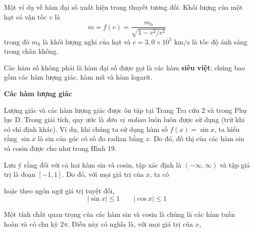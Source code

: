 \begin{minipage}[t]{0.708\textwidth}
    \fontsize{9.3pt}{13.2pt}\selectfont
    Một ví dụ về hàm đại số xuất hiện trong thuyết tương đối. Khối lượng của một hạt có vận tốc $v$ là
    \begin{equation*}
    m = f(v) = \frac{m_0}{\sqrt{1 - v^2/c^2}}
    \end{equation*}
    trong đó $m_0$ là khối lượng nghỉ của hạt và $c = 3{,}0 \times 10^5\text{ km/s}$ là tốc độ ánh sáng trong chân không.

    \vspace{4pt}
    Các hàm số không phải là hàm đại số được gọi là các hàm \textbf{siêu việt}; chúng bao gồm các hàm lượng giác, hàm mũ và hàm logarit.

    \vspace{10pt}
    \noindent{\color{stewartcyan}\rule{1.2ex}{1.2ex}}\hspace{0.5em}\textbf{\textsf{\large Các hàm lượng giác}}\par\vspace{6pt}
    Lượng giác và các hàm lượng giác được ôn tập tại Trang Tra cứu 2 và trong Phụ lục D. Trong giải tích, quy ước là \emph{đơn vị radian} luôn luôn được sử dụng (trừ khi có chỉ định khác). Ví dụ, khi chúng ta sử dụng hàm số $f(x) = \sin x$, ta hiểu rằng $\sin x$ là sin của góc có số đo radian bằng $x$. Do đó, đồ thị của các hàm sin và cosin được cho như trong Hình 19.

    \vspace{65pt}
    Lưu ý rằng đối với cả hai hàm sin và cosin, tập xác định là $(-\infty, \infty)$ và tập giá trị là đoạn $[-1, 1]$. Do đó, với mọi giá trị của $x$, ta có
    \begin{center}
    \setlength{\fboxrule}{0.8pt}
    \setlength{\fboxsep}{7pt}
    \end{center}
    hoặc theo ngôn ngữ giá trị tuyệt đối,
    \begin{equation*}
    |\sin x| \leqslant 1 \qquad |\cos x| \leqslant 1
    \end{equation*}

    Một tính chất quan trọng của các hàm sin và cosin là chúng là các hàm tuần hoàn và có chu kỳ $2\pi$. Điều này có nghĩa là, với mọi giá trị của $x$,
    \begin{center}
    \setlength{\fboxrule}{0.8pt}
    \setlength{\fboxsep}{7pt}
    \end{center}


\end{minipage}
